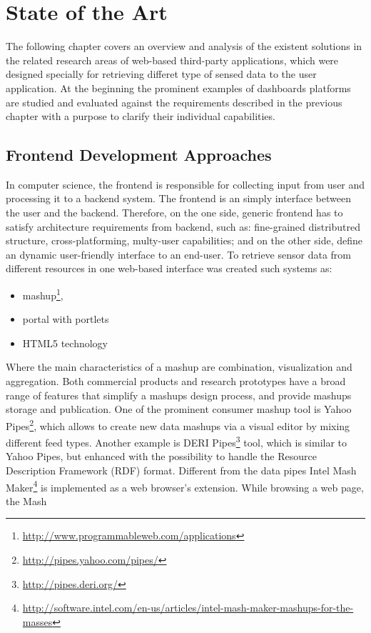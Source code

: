 \chapter{State of the Art}
The following chapter covers an overview and analysis of the existent solutions in
the related research areas of web-based third-party applications, which were designed specially for retrieving differet type of sensed data to the user application. At the beginning the prominent examples of dashboards platforms are studied and evaluated against the requirements described in the previous chapter with a purpose to clarify their individual capabilities.
\section{Frontend Development Approaches}
In computer science, the frontend is responsible for collecting input from user and processing it to a backend system. The frontend is an simply interface between the user and the backend. Therefore, on the one side, generic frontend has to satisfy architecture requirements from backend, such as: fine-grained distributred structure, cross-platforming, multy-user capabilities; and on the other side, define an dynamic user-friendly interface to an end-user.
\newline
To retrieve sensor data from different resources in one web-based interface was created such systems as:
\begin{itemize}
 \item mashup\footnote{\url{http://www.programmableweb.com/applications}},
 \item portal with portlets
 \item HTML5 technology
\end{itemize}
Where the main characteristics of a mashup are combination, visualization and aggregation. Both commercial products and research prototypes have a broad range of features that simplify a mashups design process, and provide mashups storage and publication.
One of the prominent consumer mashup tool is Yahoo Pipes\footnote{\url{http://pipes.yahoo.com/pipes/}}, which allows to create new data mashups via a visual editor by mixing different feed types. Another example is DERI Pipes\footnote{\url{http://pipes.deri.org/}} tool, which is similar to Yahoo Pipes, but enhanced with the possibility to handle the Resource Description Framework (RDF) format. Different from the data pipes Intel Mash Maker\footnote{\url{http://software.intel.com/en-us/articles/intel-mash-maker-mashups-for-the-masses}} is implemented as a web browser’s extension. While browsing a web page, the Mash
